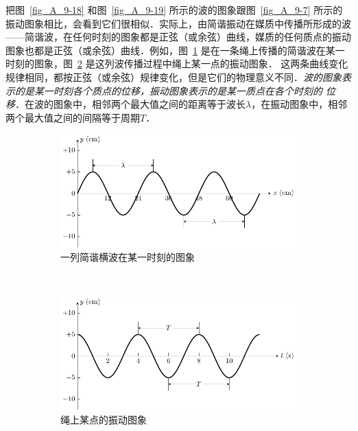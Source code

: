把图~\ref{fig_A_9-18} 和图~\ref{fig_A_9-19} 所示的波的图象跟图~\ref{fig_A_9-7} 所示的振动图象相比，会看到它们很相似．实际上，由简谐振动在媒质中传播所形成的波——简谐波，在任何时刻的图象都是正弦（或余弦）曲线，媒质的任何质点的振动图象也都是正弦（或余弦）曲线．例如，图~\ref{fig_A_9-20a} 是在一条绳上传播的简谐波在某一时刻的图象，图~\ref{fig_A_9-20b} 是这列波传播过程中绳上某一点的振动图象．
这两条曲线变化规律相同，都按正弦（或余弦）规律变化，但是它们的物理意义不同．\textit{波的图象表示的是某一时刻各个质点的位移，振动图象表示的是某一质点在各个时刻的
位移}．在波的图象中，相邻两个最大值之间的距离等于波长$\lambda$，在振动图象中，相邻两个最大值之间的间隔等于周期$T$．
\begin{figure}[htbp]
    \centering
    \begin{subfigure}{0.8\linewidth}
        \centering
        \includegraphics{fig/A/9-20a.pdf}
        \caption{一列简谐横波在某一时刻的图象}\label{fig_A_9-20a}
    \end{subfigure}
    \\
    \begin{subfigure}{0.8\linewidth}
        \centering
        \includegraphics{fig/A/9-20b.pdf}
        \caption{绳上某点的振动图象}\label{fig_A_9-20b}
    \end{subfigure}
    \caption{}\label{fig_A_9-20}
\end{figure}

